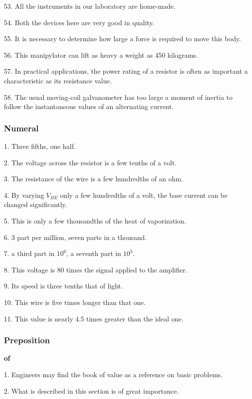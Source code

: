\documentclass[a4paper,twocolumn,10pt]{article}
\begin{document}
\begin{CJK}{UTF8}{gkai}
	53. All the instruments in our laboratory are home-made.

	54. Both the devices here are very good in quality.

	55. It is necessary to determine how large a force is required to move this body.

	56. This manipylator can lift as heavy a weight as 450 kilograms.

	57. In practical applications, the power rating of a resistor is often as important
	a characteristic as its resistance value.

	58. The usual moving-coil galvanometer has too large a moment of inertia to follow
	the instantaneous values of an alternating current.

	\subsubsection{Numeral}

	1. Three fifths, one half.

	2. The voltage across the resistor is a few tenths of a volt.

	3. The resistance of the wire is a few hundredths of an ohm.

	4. By varying $V_{BE}$ only a few hundredths of a volt, the base current can be changed significantly.

	5. This is only a few thousandths of the heat of vaporization.

	6. 3 part per million, seven parts in a thousand.

	7. a third part in $10^6$, a seventh part in $10^3$.

	8. This voltage is 80 times the signal applied to the amplifier.

	9. Its speed is three tenths that of light.

	10. This wire is five times longer than that one.

	11. This value is nearly 4.5 times greater than the ideal one.

	\subsubsection{Preposition}

	{\bf of}

	1. Engineers may find the book of value as a reference on basic problems.

	2. What is described in this section is of great importance.


\end{CJK}
\end{document}
